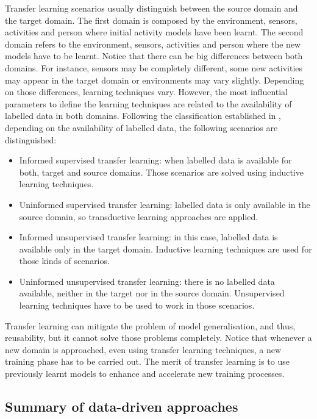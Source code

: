 Transfer learning scenarios usually distinguish between the source domain and the target domain. The first domain is composed by the environment, sensors, activities and person where initial activity models have been learnt. The second domain refers to the environment, sensors, activities and person where the new models have to be learnt. Notice that there can be big differences between both domains. For instance, sensors may be completely different, some new activities may appear in the target domain or environments may vary slightly. Depending on those differences, learning techniques vary. However, the most influential parameters to define the learning techniques are related to the availability of labelled data in both domains. Following the classification established in \cite{Cook2013}, depending on the availability of labelled data, the following scenarios are distinguished:

\begin{itemize}
 \item Informed supervised transfer learning: when labelled data is available for both, target and source domains. Those scenarios are solved using inductive learning techniques.
 \item Uninformed supervised transfer learning: labelled data is only available in the source domain, so transductive learning approaches are applied.
 \item Informed unsupervised transfer learning: in this case, labelled data is available only in the target domain. Inductive learning techniques are used for those kinds of scenarios.
 \item Uninformed unsupervised transfer learning: there is no labelled data available, neither in the target nor in the source domain. Unsupervised learning techniques have to be used to work in those scenarios.
\end{itemize}

Transfer learning can mitigate the problem of model generalisation, and thus, reusability, but it cannot solve those problems completely. Notice that whenever a new domain is approached, even using transfer learning techniques, a new training phase has to be carried out. The merit of transfer learning is to use previously learnt models to enhance and accelerate new training processes.


\subsection{Summary of data-driven approaches}

